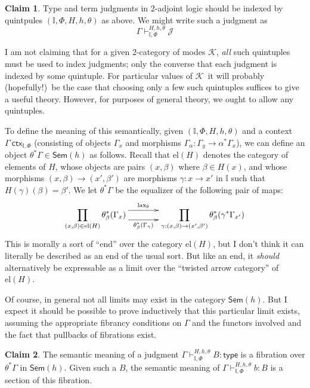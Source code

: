 \documentclass{amsart}
\def\type{\mathsf{type}}
\def\J{\mathcal{J}}
\def\K{\ensuremath{\mathcal{K}}}
\def\I{\ensuremath{\mathbb{I}}}
\def\ctx{\:\mathsf{ctx}}
\def\sem{\mathsf{Sem}}
\def\el{\mathrm{el}}
\theoremstyle{definition}
\newtheorem{claim}{Claim}
\begin{document}
\begin{claim}
  Type and term judgments in 2-adjoint logic should be indexed by quintpules $(\I,\Phi,H,h,\theta)$ as above.
  We might write such a judgment as
  \[ \Gamma\vdash_{\I,\Phi}^{H,h,\theta} \J \]
\end{claim}

I am not claiming that for a given 2-category of modes \K, \emph{all} such quintuples must be used to index judgments; only the converse that each judgment is indexed by some quintuple.
For particular values of \K\ it will probably (hopefully!)\ be the case that choosing only a few such quintuples suffices to give a useful theory.
However, for purposes of general theory, we ought to allow any quintuples.

To define the meaning of this semantically, given $(\I,\Phi,H,h,\theta)$ and a context $\Gamma\ctx_{\I,\Phi}$ (consisting of objects $\Gamma_x$ and morphisms $\Gamma_\alpha : \Gamma_y \to \alpha^*\Gamma_x$), we can define an object $\theta^*\Gamma \in \sem(h)$ as follows.
Recall that $\el(H)$ denotes the category of elements of $H$, whose objects are pairs $(x,\beta)$ where $\beta\in H(x)$, and whose morphisms $(x,\beta)\to (x',\beta')$ are morphisms $\gamma :x\to x'$ in $\I$ such that $H(\gamma)(\beta) = \beta'$.
We let $\theta^*\Gamma$ be the equalizer of the following pair of maps:
\[ \xymatrix@C=3pc{\displaystyle\prod_{(x,\beta)\in\el(H)} \theta_\beta^*(\Gamma_x)
  \ar@<2mm>[r]^-{\mathrm{lax}_\theta} \ar@<-2mm>[r]_-{\theta_\beta^*(\Gamma_\gamma)} &
  \displaystyle\prod_{\gamma : (x,\beta)\to (x',\beta')} \theta_\beta^*(\gamma^* \Gamma_{x'})} \] 
This is morally a sort of ``end'' over the category $\el(H)$, but I don't think it can literally be described as an end of the usual sort.
But like an end, it \emph{should} alternatively be expressable as a limit over the ``twisted arrow category'' of $\el(H)$.

Of course, in general not all limits may exist in the category $\sem(h)$.
But I expect it should be possible to prove inductively that this particular limit exists, assuming the appropriate fibrancy conditions on $\Gamma$ and the functors involved and the fact that pullbacks of fibrations exist.

\begin{claim}
  The semantic meaning of a judgment $\Gamma\vdash_{\I,\Phi}^{H,h,\theta} B:\type$ is a fibration over $\theta^*\Gamma$ in $\sem(h)$.
  Given such a $B$, the semantic meaning of $\Gamma\vdash_{\I,\Phi}^{H,h,\theta} b:B$ is a section of this fibration.
\end{claim}
\end{document}
